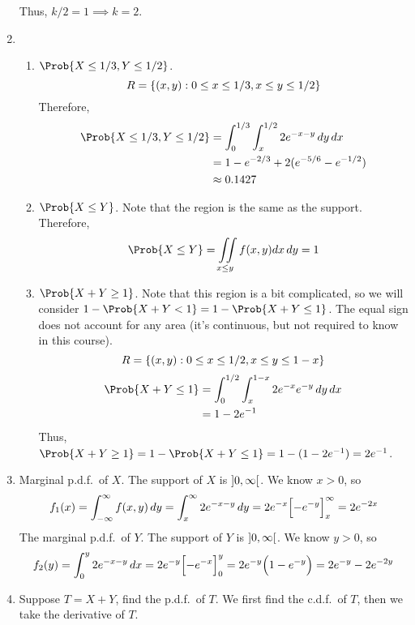 \begin{Example}{}{}
\begin{enumerate}[label=(\roman*)]
              Thus, $ k/2=1\implies k=2 $.
        \item \begin{enumerate}[label=(\alph*)]
                  \item $ \Prob{X\le 1/3,Y\le 1/2} $.
                        \[ R=\{(x,y):0\le x\le 1/3, x\le y\le 1/2\} \]
                        Therefore,
                        \begin{align*}
                            \Prob{X\le 1/3,Y\le 1/2}
                             & =\int_{0}^{1/3} \int_{x}^{1/2} 2e^{-x-y}\, d{y} \, d{x} \\
                             & =1-e^{-2/3}+2(e^{-5/6}-e^{-1/2})                        \\
                             & \approx 0.1427
                        \end{align*}
                  \item $ \Prob{X\le Y} $. Note that the region
                        is the same as the support. Therefore,
                        \[ \Prob{X\le Y}
                            =\iint\limits_{x\le y}f(x,y)dx\,dy=1 \]
                  \item $ \Prob{X+Y\ge 1} $. Note that this region is a
                        bit complicated, so we will consider $ 1-\Prob{X+Y<1}
                            =1-\Prob{X+Y\le 1} $.
                        The equal sign does not account for any area (it's continuous,
                        but not required to know in this course).
                        \[ R=\{(x,y):0\le x\le 1/2,x\le y\le 1-x\} \]
                        \begin{align*}
                            \Prob{X+Y\le 1}
                             & =\int_{0}^{1/2} \int_{x}^{1-x} 2e^{-x}e^{-y}\, d{y} \, d{x} \\
                             & =1-2e^{-1}
                        \end{align*}
                        Thus, $ \Prob{X+Y\ge 1}
                            =1-\Prob{X+Y\le 1}
                            =1-(1-2e^{-1})=2e^{-1} $.
              \end{enumerate}
        \item Marginal p.d.f.\ of $ X $. The support of $ X $ is
              $ \interval[open]{0}{\infty} $. We know $ x>0 $, so
              \[ f_1(x)=
                  \int_{-\infty}^{\infty} f(x,y)\, d{y}
                  =\int_{x}^{\infty} 2e^{-x-y}\, d{y}
                  =2e^{-x}\Bigl[ -e^{-y} \Bigr]_x^\infty=2e^{-2x} \]
              The marginal p.d.f.\ of $ Y $. The support of $ Y $ is
              $ \interval[open]{0}{\infty} $. We know $ y>0 $, so
              \[ f_2(y)=
                  \int_{0}^{y}2e^{-x-y}\, d{x} =
                  2e^{-y}\Bigl[ -e^{-x} \Bigr]_0^y
                  =2e^{-y}\Bigl( 1-e^{-y} \Bigr)=
                  2e^{-y}-2e^{-2y} \]
        \item Suppose $ T=X+Y $, find the p.d.f.\ of $ T $.
              We first find the c.d.f.\ of $ T $, then we take the derivative
              of $ T $.


\end{enumerate}
\end{Example}
